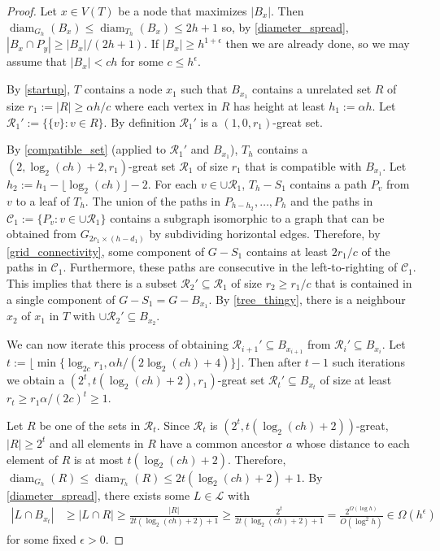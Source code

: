 \documentclass{patmorin}
\DeclareMathOperator{\diam}{diam}
\renewcommand{\le}{\leqslant}
\renewcommand{\ge}{\geqslant}
\begin{document}
\begin{proof}
  Let $x\in V(T)$ be a node that maximizes $|B_x|$.  Then $\diam_{G_h}(B_x)\le\diam_{T_h}(B_x) \le 2h+1$ so, by \cref{diameter_spread}, $|B_x\cap P_y|\ge |B_x|/(2h+1)$.  If $|B_x|\ge h^{1+\epsilon}$ then we are already done, so we may assume that $|B_x| < ch$ for some $c \le h^{\epsilon}$.

  By \cref{startup}, $T$ contains a node $x_1$ such that $B_{x_1}$ contains a unrelated set $R$ of size $r_1:=|R|\ge \alpha h/c$ where each vertex in $R$ has height at least $h_1:=\alpha h$.  Let  $\mathcal{R}_1':=\{\{v\}:v\in R\}$.  By definition $\mathcal{R}_1'$ is a $(1,0,r_1)$-great set.

  By \cref{compatible_set} (applied to $\mathcal{R}_1'$ and $B_{x_1}$), $T_h$ contains a $(2,\log_2(ch)+2,r_1)$-great set $\mathcal{R}_1$ of size $r_1$ that is compatible with $B_{x_1}$.  Let $h_2:=h_1-\lfloor\log_2(ch)\rfloor -2$.  For each $v\in\cup\mathcal{R}_1$, $T_h-S_1$ contains a path $P_v$ from $v$ to a leaf of $T_h$.  The union of the paths in $P_{h-h_2},\ldots,P_{h}$ and the paths in $\mathcal{C}_1:=\{P_v:v\in\cup\mathcal{R}_1\}$ contains a subgraph isomorphic to a graph that can be obtained from $G_{2r_1\times (h-d_1)}$ by subdividing horizontal edges.  Therefore, by \cref{grid_connectivity}, some component of $G-S_1$ contains at least $2r_1/c$ of the paths in $\mathcal{C}_1$.  Furthermore, these paths are consecutive in the left-to-righting of $\mathcal{C}_1$.  This implies that there is a subset $\mathcal{R}_2'\subseteq \mathcal{R}_1$ of size $r_2\ge r_1/c$ that is contained in a single component of $G-S_1=G-B_{x_1}$. By \cref{tree_thingy}, there is a neighbour $x_2$ of $x_1$ in $T$ with $\cup\mathcal{R}_2'\subseteq B_{x_2}$.

  We can now iterate this process of obtaining $\mathcal{R}_{i+1}'\subseteq B_{x_{i+1}}$ from $\mathcal{R}_i'\subseteq B_{x_i}$. Let $t:= \lfloor \min\{\log_{2c} r_1,\alpha h/(2\log_2(ch)+4)\}\rfloor$. Then after $t-1$ such iterations we obtain a $(2^t,t(\log_2(ch)+2),r_1)$-great set $\mathcal{R}_t'\subseteq B_{x_t}$ of size at least $r_t \ge r_1\alpha/(2c)^t \ge 1$.

  Let $R$ be one of the sets in $\mathcal{R}_t$.  Since $\mathcal{R}_t$ is $(2^t,t(\log_2(ch)+2))$-great, $|R|\ge 2^t$ and all elements in $R$ have a common ancestor $a$ whose distance to each element of $R$ is at most $t(\log_2(ch)+2)$.  Therefore, $\diam_{G_h}(R)\le\diam_{T_h}(R)\le 2t(\log_2(ch)+2)+1$. By \cref{diameter_spread}, there exists some $L\in\mathcal{L}$ with
  \begin{align*}
    |L\cap B_{x_t}| 
    & \ge |L\cap R| 
    \ge \frac{|R|}{2t(\log_2(ch)+2)+1} 
    \ge \frac{2^t}{2t(\log_2(ch)+2)+1} 
    = \frac{2^{\Omega(\log h)}}{O(\log^2 h)} 
    \in \Omega(h^\epsilon) 
  \end{align*}
  for some fixed $\epsilon >0$.
\end{proof}
\end{document}

